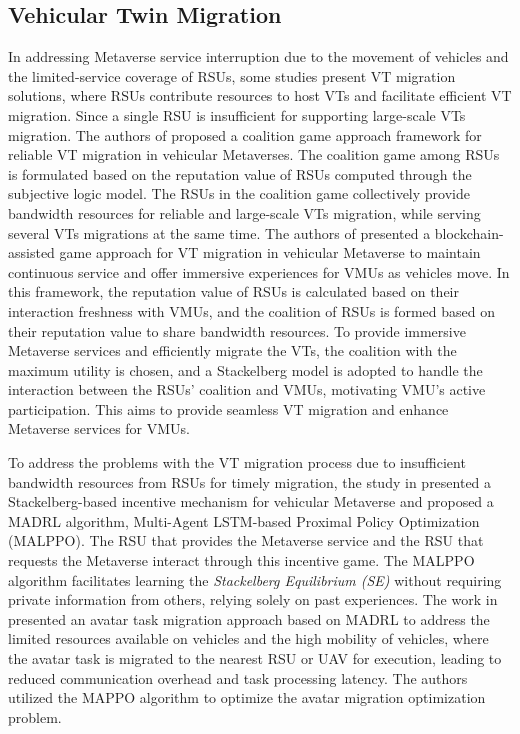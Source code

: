  \subsection{Vehicular Twin Migration}
In addressing Metaverse service interruption due to the movement of vehicles and the limited-service coverage of RSUs, some studies present VT migration solutions, where RSUs contribute resources to host VTs and facilitate efficient VT migration. Since a single RSU is insufficient for supporting large-scale VTs migration. The authors of \cite{10281020} proposed a coalition game approach framework for reliable VT migration in vehicular Metaverses. The coalition game among RSUs is formulated based on the reputation value of RSUs computed through the subjective logic model. 
The RSUs in the coalition game collectively provide bandwidth resources for reliable and large-scale VTs migration, while serving several VTs migrations at the same time.
 The authors of \cite{zhong2023blockchain} presented a blockchain-assisted game approach for VT migration in vehicular Metaverse to maintain continuous service and offer immersive experiences for VMUs as vehicles move. In this framework, the reputation value of RSUs is calculated based on their interaction freshness with VMUs, and the coalition of RSUs is formed based on their reputation value to share bandwidth resources. To provide immersive Metaverse services and efficiently migrate the VTs,  the coalition with the maximum utility is chosen, and a Stackelberg model is adopted to handle the interaction between the RSUs' coalition and VMUs, motivating VMU's active participation. This aims to provide seamless VT migration and enhance Metaverse services for VMUs. 
 
 To address the problems with the VT migration process due to insufficient bandwidth resources from RSUs for timely migration, the study in \cite{10505943} presented a Stackelberg-based incentive mechanism for vehicular Metaverse and proposed a MADRL algorithm, Multi-Agent LSTM-based Proximal Policy Optimization (MALPPO). The RSU that provides the Metaverse service and the RSU that requests the Metaverse interact through this incentive game.  The MALPPO algorithm facilitates learning the \textit{Stackelberg Equilibrium (SE)} without requiring private information from others, relying solely on past experiences. The work in\cite{10415630} presented an avatar task migration approach based on MADRL to address the limited resources available on vehicles and the high mobility of vehicles, where the avatar task is migrated to the nearest RSU or UAV for execution, leading to reduced communication overhead and task processing latency.  The authors utilized the MAPPO algorithm to optimize the avatar migration optimization problem. 
 
